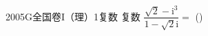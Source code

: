 
\begin{problem}{2005}{G}{全国卷I（理）}{1}{复数}
复数 $\dfrac{\sqrt{2}-\mathrm{i}^3}{1-\sqrt{2}\mathrm{i}}=$ (\hspace{1cm})
\begin{choices}
\end{choices}
\end{problem}

\begin{answer}

\end{answer}

\begin{solutions}

\end{solutions}